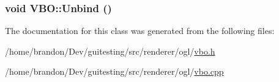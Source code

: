 \hypertarget{class_v_b_o_4b3db8676fbf6dd90d47ed91cafb0abb}{
\subsubsection[{Unbind}]{\setlength{\rightskip}{0pt plus 5cm}void VBO::Unbind ()}}
\label{class_v_b_o_4b3db8676fbf6dd90d47ed91cafb0abb}




The documentation for this class was generated from the following files:\begin{CompactItemize}
\item 
/home/brandon/Dev/guitesting/src/renderer/ogl/\hyperlink{vbo_8h}{vbo.h}\item 
/home/brandon/Dev/guitesting/src/renderer/ogl/\hyperlink{vbo_8cpp}{vbo.cpp}\end{CompactItemize}
